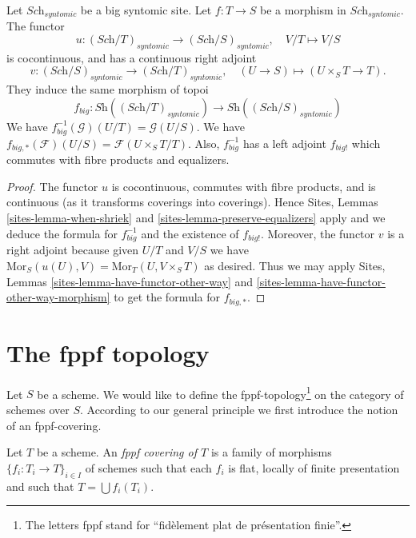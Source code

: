 \begin{lemma}
\label{lemma-morphism-big-syntomic}
Let $\textit{Sch}_{syntomic}$ be a big syntomic site.
Let $f : T \to S$ be a morphism in $\textit{Sch}_{syntomic}$.
The functor
$$
u : (\textit{Sch}/T)_{syntomic} \longrightarrow (\textit{Sch}/S)_{syntomic},
\quad
V/T \longmapsto V/S
$$
is cocontinuous, and has a continuous right adjoint
$$
v : (\textit{Sch}/S)_{syntomic} \longrightarrow (\textit{Sch}/T)_{syntomic},
\quad
(U \to S) \longmapsto (U \times_S T \to T).
$$
They induce the same morphism of topoi
$$
f_{big} :
\textit{Sh}((\textit{Sch}/T)_{syntomic})
\longrightarrow
\textit{Sh}((\textit{Sch}/S)_{syntomic})
$$
We have $f_{big}^{-1}(\mathcal{G})(U/T) = \mathcal{G}(U/S)$.
We have $f_{big, *}(\mathcal{F})(U/S) = \mathcal{F}(U\times_ST/T)$.
Also, $f_{big}^{-1}$ has a left adjoint $f_{big!}$ which commutes with
fibre products and equalizers.
\end{lemma}

\begin{proof}
The functor $u$ is cocontinuous, commutes with fibre products,
and is continuous (as it transforms coverings into coverings).
Hence Sites, Lemmas \ref{sites-lemma-when-shriek}
and \ref{sites-lemma-preserve-equalizers}
apply and we deduce the formula
for $f_{big}^{-1}$ and the existence of $f_{big!}$. Moreover,
the functor $v$ is a right adjoint because given $U/T$ and $V/S$
we have $\text{Mor}_S(u(U), V) = \text{Mor}_T(U, V\times_S T)$
as desired. Thus we may apply
Sites, Lemmas \ref{sites-lemma-have-functor-other-way} and
\ref{sites-lemma-have-functor-other-way-morphism} to get the
formula for $f_{big, *}$.
\end{proof}













\section{The fppf topology}
\label{section-fppf}

\noindent
Let $S$ be a scheme. We would like to define the fppf-topology\footnote{
The letters fppf stand for ``fid\`element plat de pr\'esentation finie''.} on
the category of schemes over $S$. According to our general principle
we first introduce the notion of an fppf-covering.

\begin{definition}
\label{definition-fppf-covering}
Let $T$ be a scheme. An {\it fppf covering of $T$} is a family
of morphisms $\{f_i : T_i \to T\}_{i \in I}$ of schemes
such that each $f_i$ is flat, locally of finite presentation and such
that $T = \bigcup f_i(T_i)$.
\end{definition}

